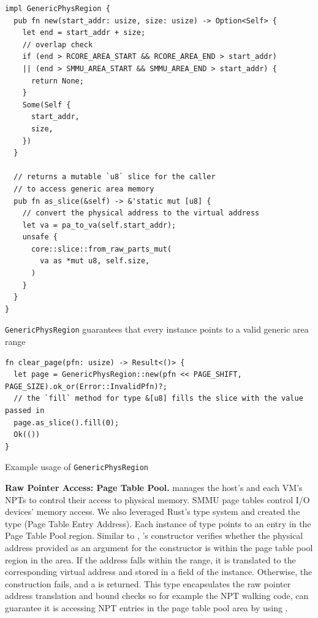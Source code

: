 \begin{listing}[hbtp]
    \begin{verbatim}
impl GenericPhysRegion {
  pub fn new(start_addr: usize, size: usize) -> Option<Self> {
    let end = start_addr + size;
    // overlap check
    if (end > RCORE_AREA_START && RCORE_AREA_END > start_addr)
    || (end > SMMU_AREA_START && SMMU_AREA_END > start_addr) {
      return None;
    }
    Some(Self {
      start_addr,
      size,
    })
  }

  // returns a mutable `u8` slice for the caller
  // to access generic area memory
  pub fn as_slice(&self) -> &'static mut [u8] {
    // convert the physical address to the virtual address
    let va = pa_to_va(self.start_addr);
    unsafe {
      core::slice::from_raw_parts_mut(
        va as *mut u8, self.size,
      )
    }
  }
}
    \end{verbatim}
    \caption{\texttt{GenericPhysRegion} guarantees that every instance points to a valid generic area range}
    \label{lst:genericphysslice}
    \vspace{-0.2cm}
\end{listing}

\begin{listing}[hbtp]
    \begin{verbatim}
fn clear_page(pfn: usize) -> Result<()> {
  let page = GenericPhysRegion::new(pfn << PAGE_SHIFT, PAGE_SIZE).ok_or(Error::InvalidPfn)?;
  // the `fill` method for type &[u8] fills the slice with the value passed in
  page.as_slice().fill(0);
  Ok(())
}
    \end{verbatim}
    \caption{Example usage of \texttt{GenericPhysRegion}}
    \label{lst:genericusage}
    \vspace{-0.2cm}
\end{listing}

\textbf{Raw Pointer Access: Page Table Pool.}
\rustcore{} manages the host's and each VM's NPTs to control their access to
physical memory. SMMU page tables control I/O devices' memory access.
We also leveraged Rust's type system and created the
type  (Page Table Entry Address). Each instance of type 
points to an entry in the \rustcore{} Page Table Pool region.
Similar to , 's constructor verifies whether the physical address provided as an
argument for the constructor is within the page table pool region in the \rustcore{}
area. If the address falls within the range, it is translated to the
corresponding virtual address and stored in a field of the
 instance. Otherwise, the construction fails, and a
 is returned.
This type encapsulates the raw pointer address translation and bound
checks so for example the NPT walking code,
can guarantee it is accessing NPT entries in the
\rustcore{} page table pool area by using .

